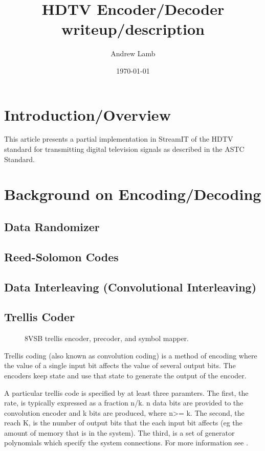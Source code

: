 \documentclass{article}
\title{HDTV Encoder/Decoder writeup/description}
\author{Andrew Lamb}
\date{\today}
\begin{document}
\maketitle
\newpage

\section{Introduction/Overview}
This article presents a partial implementation in StreamIT of the HDTV standard 
for transmitting digital television signals as described in 
the ASTC Standard\cite{atsc:a53b}.




\section{Background on Encoding/Decoding}

\subsection{Data Randomizer}

\subsection{Reed-Solomon Codes}

\subsection{Data Interleaving (Convolutional Interleaving)}

\subsection{Trellis Coder}
\begin{figure}
\center
\epsfxsize=5.5in
\caption{8VSB trellis encoder, precoder, and symbol mapper.}
\label{fig:trellis-system}
\end{figure}

Trellis coding (also known as convolution coding) 
is a method of encoding where the value of a single input 
bit affects the value of several output bits. The encoders
keep state and use that state to generate the output of the 
encoder. 

A particular trellis code is 
specified by at least three paramters. The first, the rate, is typically expressed as
a fraction n/k. n data bits are provided to the convolution encoder and k bits are produced,
where n>= k. The second, the reach K, is the number of output bits that the
each input bit affects (eg the amount of memory that is in the system). 
The third, is a set of generator polynomials which specify the system connections.
For more information see \cite{fleming:tutorial}.
\end{document}
